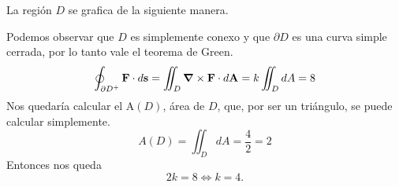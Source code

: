 \begin{solution}
    La regi\'on $D$ se grafica de la siguiente manera.

    \begin{center}
    \end{center}


    Podemos observar que $D$ es simplemente conexo y que $\partial D$ es una curva simple cerrada, por lo tanto vale el teorema de Green.
    \[
        \oint_{\partial D^+} \mathbf{F}\cdot d\mathbf{s}=\iint_D \grad\times\mathbf{F}\cdot d\mathbf{A}=k\iint_DdA=8
    \]
    Nos quedar\'ia calcular el  $\mbox{A}(D)$,  \'area de $D$, que, por ser un tri\'angulo, se puede calcular simplemente.
    \[
        A(D) = \iint_D dA=\frac{4}{2}=2
    \]
    Entonces nos queda
    \[
        2k=8\iff k=4.
    \]
\end{solution}